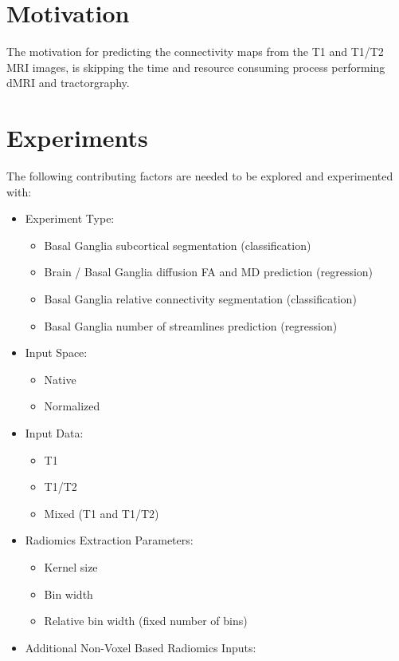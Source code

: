 \section{Motivation}

The motivation for predicting the connectivity maps from the T1 and T1/T2 \ac{MRI} images, is skipping the time and resource consuming process performing \ac{dMRI} and tractorgraphy.

\section{Experiments}

The following contributing factors are needed to be explored and experimented with:
\begin{itemize}
  \item Experiment Type:
  \begin{itemize}
    \item Basal Ganglia subcortical segmentation (classification)
    \item Brain / Basal Ganglia diffusion \ac{FA} and \ac{MD} prediction (regression)
    \item Basal Ganglia relative connectivity segmentation (classification)
    \item Basal Ganglia number of streamlines prediction (regression)
  \end{itemize}
  \item Input Space:
  \begin{itemize}
    \item Native
    \item Normalized
  \end{itemize}
  \item Input Data:
  \begin{itemize}
    \item T1
    \item T1/T2
    \item Mixed (T1 and T1/T2)
  \end{itemize}
  \item Radiomics Extraction Parameters:
  \begin{itemize}
    \item Kernel size
    \item Bin width
    \item Relative bin width (fixed number of bins)
  \end{itemize}
  \item Additional Non-Voxel Based Radiomics Inputs:
  \begin{itemize}

\end{itemize}
\end{itemize}
